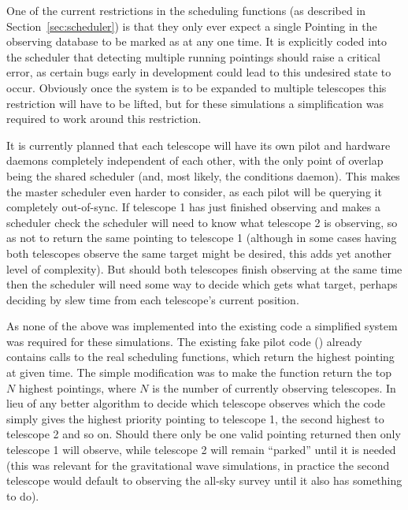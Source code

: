 \begin{colsection}
\begin{colsection}
One of the current restrictions in the scheduling functions (as described in Section~\ref{sec:scheduler}) is that they only ever expect a single Pointing in the observing database to be marked as  at any one time. It is explicitly coded into the scheduler that detecting multiple running pointings should raise a critical error, as certain bugs early in development could lead to this undesired state to occur. Obviously once the system is to be expanded to multiple telescopes this restriction will have to be lifted, but for these simulations a simplification was required to work around this restriction.

It is currently planned that each telescope will have its own pilot and hardware daemons completely independent of each other, with the only point of overlap being the shared scheduler (and, most likely, the conditions daemon). This makes the master scheduler even harder to consider, as each pilot will be querying it completely out-of-sync. If telescope 1 has just finished observing and makes a scheduler check the scheduler will need to know what telescope 2 is observing, so as not to return the same pointing to telescope 1 (although in some cases having both telescopes observe the same target might be desired, this adds yet another level of complexity). But should both telescopes finish observing at the same time then the scheduler will need some way to decide which gets what target, perhaps deciding by slew time from each telescope's current position.

As none of the above was implemented into the existing code a simplified system was required for these simulations. The existing fake pilot code () already contains calls to the real scheduling functions, which return the highest pointing at given time. The simple modification was to make the function return the top $N$ highest pointings, where $N$ is the number of currently observing telescopes. In lieu of any better algorithm to decide which telescope observes which the code simply gives the highest priority pointing to telescope 1, the second highest to telescope 2 and so on. Should there only be one valid pointing returned then only telescope 1 will observe, while telescope 2 will remain ``parked'' until it is needed (this was relevant for the gravitational wave simulations, in practice the second telescope would default to observing the all-sky survey until it also has something to do).


\end{colsection}
\end{colsection}
